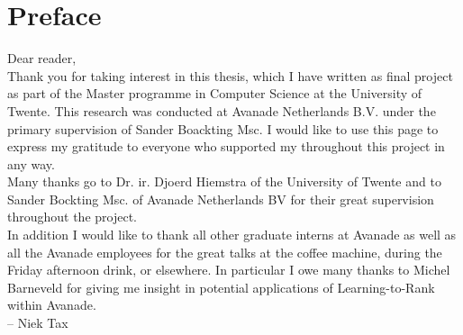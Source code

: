 
\bigskip

\begingroup
\let\clearpage\relax
\let\cleardoublepage\relax
\let\cleardoublepage\relax
\chapter*{Preface}
Dear reader,\\

Thank you for taking interest in this thesis, which I have written as final project as part of the Master programme in Computer Science at the University of Twente. This research was conducted at Avanade Netherlands B.V. under the primary supervision of Sander Boackting Msc. I would like to use this page to express my gratitude to everyone who supported my throughout this project in any way.\\

Many thanks go to Dr. ir. Djoerd Hiemstra of the University of Twente and to Sander Bockting Msc. of Avanade Netherlands BV for their great supervision throughout the project.\\

In addition I would like to thank all other graduate interns at Avanade as well as all the Avanade employees for the great talks at the coffee machine, during the Friday afternoon drink, or elsewhere. In particular I owe many thanks to Michel Barneveld for giving me insight in potential applications of Learning-to-Rank within Avanade.\\

-- Niek Tax

\endgroup




